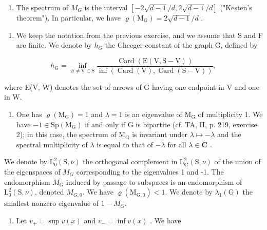 \begin{enumerate}
\def\labelenumi{\alph{enumi})}
\setcounter{enumi}{4}
\tightlist
\item
  The spectrum of \(M_{G}\) is the interval \([-2\sqrt{d-1}/d, 2\sqrt{d-1}/d]\) ("Kesten's theorem"). In particular, we have \(\varrho(\mathrm{M}_{\mathrm{G}})=2\sqrt{d-1}/d\) .
\end{enumerate}

\begin{enumerate}
\def\labelenumi{\arabic{enumi})}
\setcounter{enumi}{15}
\tightlist
\item
  We keep the notation from the previous exercise, and we assume that S and F are finite. We denote by \(h_{G}\) the Cheeger constant of the graph G, defined by
\end{enumerate}

\[
h _ {\mathrm{G}} = \inf _ {\varnothing \neq \mathrm{V} \subset \mathrm{S}} \frac {\operatorname{Card} (\mathrm{E} (\mathrm{V} , \mathrm{S} - \mathrm{V}))}{\inf (\operatorname{Card} (\mathrm{V}) , \operatorname{Card} (\mathrm{S} - \mathrm{V}))},
\]

where E(V, W) denotes the set of arrows of G having one endpoint in V and one in W.

\begin{enumerate}
\def\labelenumi{\alph{enumi})}
\tightlist
\item
  One has \(\varrho(\mathrm{M}_{\mathrm{G}})=1\) and \(\lambda=1\) is an eigenvalue of \(\mathrm{M}_{\mathrm{G}}\) of multiplicity 1. We have \(-1\in\mathrm{Sp}(\mathrm{M}_{\mathrm{G}})\) if and only if G is bipartite (cf. TA, II, p. 219, exercise 2); in this case, the spectrum of \(\mathrm{M}_{\mathrm{G}}\) is invariant under \(\lambda\mapsto-\lambda\) and the spectral multiplicity of \(\lambda\) is equal to that of \(-\lambda\) for all \(\lambda\in\mathbf{C}\) .
\end{enumerate}

We denote by \(\mathrm{L}_{0}^{2}(\mathrm{S},\nu)\) the orthogonal complement in \(\mathrm{L}_{\mathbf{C}}^{2}(\mathrm{S},\nu)\) of the union of the eigenspaces of \(M_{G}\) corresponding to the eigenvalues 1 and -1. The endomorphism \(M_{G}\) induced by passage to subspaces is an endomorphism of \(\mathrm{L}_{0}^{2}(\mathrm{S},\nu)\), denoted \(M_{G,0}\). We have \(\varrho(\mathrm{M}_{\mathrm{G},0}) < 1\). We denote by \(\lambda_{1}(\mathrm{G})\) the smallest nonzero eigenvalue of \(1 - M_{G}\).

\begin{enumerate}
\def\labelenumi{\alph{enumi})}
\setcounter{enumi}{1}
\tightlist
\item
  Let \(v_{+} = \sup v(x)\) and \(v_{-} = \inf v(x)\) . We have
\end{enumerate}

